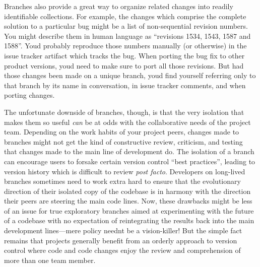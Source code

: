 Branches also provide a great way to organize related changes into
readily identifiable collections. For example, the changes which
comprise the complete solution to a particular bug might be a list of
non-sequential revision numbers. You might describe them in human
language as ``revisions 1534, 1543, 1587 and 1588''.
You\textquotesingle d probably reproduce those numbers manually (or
otherwise) in the issue tracker artifact which tracks the bug. When
porting the bug fix to other product versions, you\textquotesingle d
need to make sure to port all those revisions. But had those changes
been made on a unique branch, you\textquotesingle d find yourself
referring only to that branch by its name in conversation, in issue
tracker comments, and when porting changes.

The unfortunate downside of branches, though, is that the very isolation
that makes them so useful \emph{can} be at odds with the collaborative
needs of the project team. Depending on the work habits of your project
peers, changes made to branches might not get the kind of constructive
review, criticism, and testing that changes made to the main line of
development do. The isolation of a branch can encourage users to forsake
certain version control ``best practices'', leading to version history
which is difficult to review \emph{post facto}. Developers on long-lived
branches sometimes need to work extra hard to ensure that the
evolutionary direction of their isolated copy of the codebase is in
harmony with the direction their peers are steering the main code lines.
Now, these drawbacks might be less of an issue for true exploratory
branches aimed at experimenting with the future of a codebase with no
expectation of reintegrating the results back into the main development
lines---mere policy needn\textquotesingle t be a vision-killer! But the
simple fact remains that projects generally benefit from an orderly
approach to version control where code and code changes enjoy the review
and comprehension of more than one team member.

